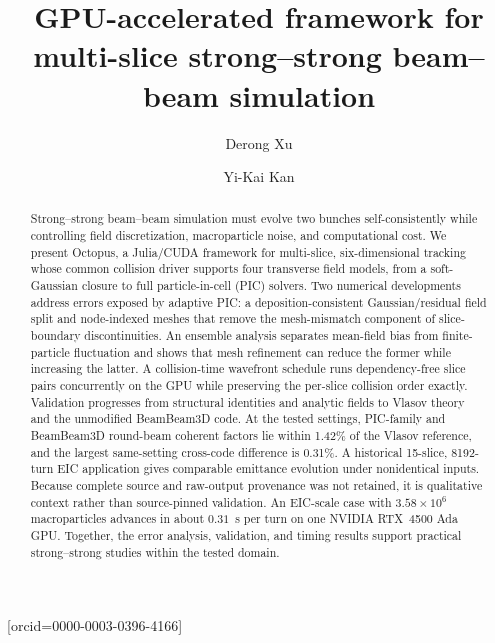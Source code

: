 \documentclass[a4paper,fleqn]{cas-sc}
\begin{document}
\let\WriteBookmarks\relax
{}

\title [mode = title]{GPU-accelerated framework for multi-slice strong--strong beam--beam simulation}
\author[1]{Derong Xu}[orcid=0000-0003-0396-4166]
\cormark[1]

\author[1]{Yi-Kai Kan}


\begin{abstract}
Strong--strong beam--beam simulation must evolve two bunches self-consistently
while controlling field discretization, macroparticle noise, and computational
cost.  We present Octopus, a Julia/CUDA framework for multi-slice,
six-dimensional tracking whose common collision driver supports four
transverse field models, from a soft-Gaussian closure to full
particle-in-cell (PIC) solvers.  Two numerical developments address errors
exposed by adaptive PIC:
a deposition-consistent Gaussian/residual field split and node-indexed meshes
that remove the mesh-mismatch component of slice-boundary discontinuities.  An
ensemble analysis separates mean-field bias from finite-particle fluctuation
and shows that mesh refinement can reduce the former while increasing the
latter.  A collision-time wavefront schedule runs dependency-free slice pairs
concurrently on the GPU while preserving the per-slice collision order
exactly.  Validation progresses from structural identities and analytic fields
to Vlasov theory and the unmodified BeamBeam3D code.  At the tested settings,
PIC-family and BeamBeam3D round-beam coherent factors lie within 1.42\% of the
Vlasov reference, and the largest same-setting cross-code difference is
0.31\%.  A historical 15-slice, 8192-turn EIC application gives comparable
emittance evolution under nonidentical inputs.  Because complete source and
raw-output provenance was not retained, it is qualitative context rather than
source-pinned validation.  An EIC-scale case with
$3.58\times10^6$ macroparticles advances in about $0.31$~s per turn on one
NVIDIA RTX~4500 Ada GPU.  Together, the error analysis, validation, and timing
results support practical strong--strong studies within the tested domain.
\end{abstract}
\end{document}
